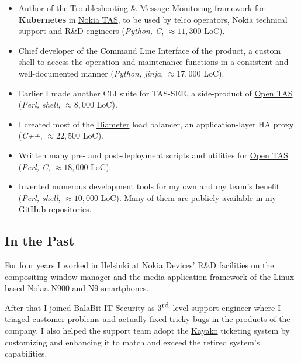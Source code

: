 \documentclass[a4paper,12pt]{article}
\newcommand\Yell{\textbf}
\newcommand{\compress}{\setlength\itemsep{-\parskip}}
\newenvironment{compressedItemize}{\begin{itemize}\compress}{\end{itemize}}
\begin{document}
\begin{compressedItemize}
\item	Author of the Troubleshooting \& Message Monitoring framework for
	\Yell{Kubernetes} in \hyperlink{TAS}{Nokia TAS}, to be used by telco
	operators, Nokia technical support and R\&D engineers (\textit{Python, C},
	$\approx 11{,}300$ LoC).
\item	Chief developer of the Command Line Interface of the product,
	a custom shell to access the operation and maintenance functions
	in a consistent and well-documented manner (\textit{Python, jinja},
	$\approx 17{,}000$ LoC).
\item	Earlier I made another CLI suite for TAS-SEE, a side-product of
	\hyperlink{TAS}{Open TAS} (\textit{Perl, shell}, $\approx 8{,}000$ LoC).
\item	I created most of the \href{https://tools.ietf.org/html/rfc6733}{Diameter}
	load balancer, an application-layer HA proxy (\textit{C++},
	$\approx 22{,}500$ LoC).
\item	Written many pre- and post-deployment scripts and utilities for
	\hyperlink{TAS}{Open TAS} (\textit{Perl, C}, $\approx 18{,}000$ LoC).
\item	Invented numerous development tools for my own and my team's benefit
	(\textit{Perl, shell}, $\approx 10{,}000$ LoC).  Many of them are
	publicly available in my \href{https://github.com/enadam?tab=repositories}%
	{GitHub repositories}.
\end{compressedItemize}

\subsection*{In the Past}

For four years I worked in Helsinki at \hypertarget{gadgets}{Nokia Devices'
R\&D facilities} on the
\href{https://wiki.maemo.org/Documentation/Maemo_5_Developer_Guide/Architecture/UI_Framework#hildon-desktop}{compositing window manager} and the
\href{https://wiki.maemo.org/Documentation/Maemo_5_Developer_Guide/Using_Multimedia_Components/Media_Application_Framework_(MAFW)}{media application framework}
of the Linux-based Nokia \href{http://maemo.org/intro/maemo_history}{N900}
and \href{https://en.wikipedia.org/wiki/Nokia_N9}{N9} smartphones.

\medskip
After that I joined BalaBit IT Security as $3^{\textrm{\small rd}}$ level
support engineer where I triaged customer problems and actually fixed
tricky bugs in the products of the company.  I also helped the support
team adopt the \href{https://www.kayako.com}{Kayako} ticketing system by
customizing and enhancing it to match and exceed the retired system's
capabilities.
\end{document}
